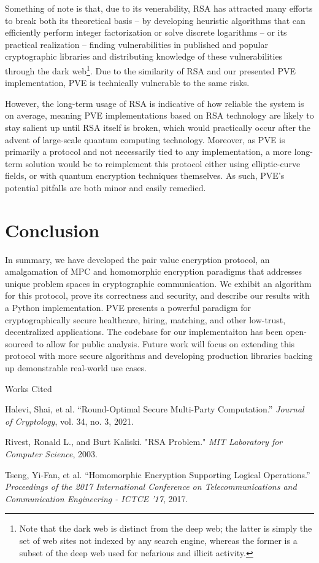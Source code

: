 \documentclass{article}
\newcommand{\bibent}{\noindent \hangindent 40pt}
\newenvironment{workscited}{\vspace{-0.5cm}\begin{center} Works Cited \end{center}}{\newpage }
\begin{document}
\begin{multicols}{2}
Something of note is that, due to its venerability, RSA has attracted many efforts to break both its theoretical basis – by developing heuristic algorithms that can efficiently perform integer factorization or solve discrete logarithms – or its practical realization – finding vulnerabilities in published and popular cryptographic libraries and distributing knowledge of these vulnerabilities through the dark web\footnote{Note that the dark web is distinct from the deep web; the latter is simply the set of web sites not indexed by any search engine, whereas the former is a subset of the deep web used for nefarious and illicit activity.}. Due to the similarity of RSA and our presented PVE implementation, PVE is technically vulnerable to the same risks.

However, the long-term usage of RSA is indicative of how reliable the system is on average, meaning PVE implementations based on RSA technology are likely to stay salient up until RSA itself is broken, which would practically occur after the advent of large-scale quantum computing technology. Moreover, as PVE is primarily a protocol and not necessarily tied to any implementation, a more long-term solution would be to reimplement this protocol either using elliptic-curve fields, or with quantum encryption techniques themselves. As such, PVE's potential pitfalls are both minor and easily remedied.

\section{Conclusion}

In summary, we have developed the pair value encryption protocol, an amalgamation of MPC and homomorphic encryption paradigms that addresses unique problem spaces in cryptographic communication. We exhibit an algorithm for this protocol, prove its correctness and security, and describe our results with a Python implementation. PVE presents a powerful paradigm for cryptographically secure healthcare, hiring, matching, and other low-trust, decentralized applications. The codebase for our implementaiton has been open-sourced to allow for public analysis. Future work will focus on extending this protocol with more secure algorithms and developing production libraries backing up demonstrable real-world use cases.

\end{multicols}

\begin{workscited}

\bibent
Halevi, Shai, et al. “Round-Optimal Secure Multi-Party Computation.” \textit{Journal of Cryptology}, vol. 34, no. 3, 2021.

\bibent
Rivest, Ronald L., and Burt Kaliski. "RSA Problem." \textit{MIT Laboratory for Computer Science}, 2003.

\bibent
Tseng, Yi-Fan, et al. “Homomorphic Encryption Supporting Logical Operations.” \textit{Proceedings of the 2017 International Conference on Telecommunications and Communication Engineering - ICTCE '17}, 2017.

\end{workscited}
\end{document}
